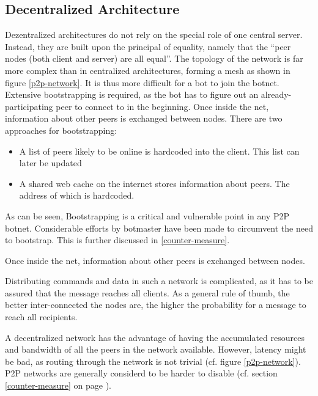 \documentclass{llncs}
\begin{document}
\subsection{Decentralized Architecture}
\label{decent}
Dezentralized architectures do not rely on the special role of one
central server. Instead, they are built upon the principal of
equality, namely that the ``peer nodes (both client and server) are
all equal''\cite{steggink2007detection}. The topology of the network
is far more complex than in centralized architectures, forming a mesh
as shown in figure \ref{p2p-network}. It is thus more difficult for a
bot to join the botnet. Extensive bootstrapping is required, as the
bot has to figure out an already-participating peer to connect to in the
beginning. Once inside the net, information about other peers is
exchanged between nodes. There are two approaches for bootstrapping\cite{wang2009systematic}:
\begin{itemize}
\item A list of peers likely to be online is hardcoded into the client. This list can later be updated
\item A shared web cache on the internet stores information about
  peers. The address of which is hardcoded.
\end{itemize}

As can be seen, Bootstrapping is a critical and vulnerable point in
any P2P botnet. Considerable efforts by botmaster have been made to
circumvent the need to bootstrap\cite{td1sc}. This is further
discussed in \ref{counter-measure}.

Once inside the net, information about other peers is
exchanged between nodes.

Distributing commands and data in such a network is complicated, as it
has to be assured that the message reaches all clients. As a general
rule of thumb, the better inter-connected the nodes are, the higher
the probability for a message to reach all recipients.

A decentralized network has the advantage of having the accumulated
resources and bandwidth of all the peers in the network
available. However, latency might be bad, as routing through the
network is not trivial (cf. figure \ref{p2p-network}). P2P networks
are generally considerd to be harder to disable (cf. section
\ref{counter-measure} on page \pageref{counter-measure}).
\end{document}

